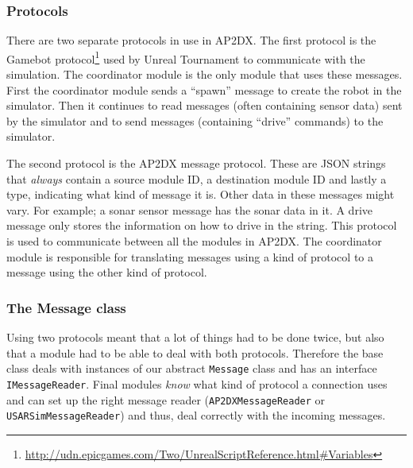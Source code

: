 \subsubsection{Protocols}
There are two separate protocols in use in AP2DX. The first protocol is the
Gamebot
protocol\footnote{\url{http://udn.epicgames.com/Two/UnrealScriptReference.html\#Variables}} 
used by Unreal Tournament to communicate with the simulation. The coordinator module is the 
only module that uses these messages. First the coordinator module sends a ``spawn'' message 
to create the robot in the simulator. Then it continues to read messages (often containing 
sensor data) sent by the simulator and to send messages (containing ``drive'' commands) to
the simulator. 

The second protocol is the AP2DX message protocol. These are JSON strings that \emph{always}
contain a source module ID, a destination module ID and lastly a type, indicating what kind
of message it is. Other data in these messages might vary. For example; a sonar sensor
message has the sonar data in it. A drive message only stores the information on how to drive
in the string. 
This protocol is used to communicate between all the modules in 
AP2DX.  The coordinator module is responsible for translating messages using a kind of
protocol to a message using the other kind of protocol.

\subsubsection{The Message class}
Using two protocols meant that a lot of things had to be done twice, but also that a module 
had to be able to deal with both protocols. Therefore the 
base class deals with instances
of our abstract \texttt{Message} class and has an interface \texttt{IMessageReader}. Final modules \emph{know}
what kind of protocol a connection uses and can set up the right message reader 
(\texttt{AP2DXMessageReader}
or \texttt{USARSimMessageReader}) and thus, deal correctly with the incoming messages. 

